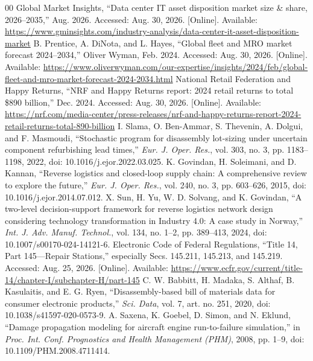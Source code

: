 \documentclass[a4paper,conference]{IEEEtran}
\begin{document}
\begin{thebibliography}{00}
 Global Market Insights, ``Data center IT asset disposition market size \& share, 2026--2035,'' Aug. 2026. Accessed: Aug. 30, 2026. [Online]. Available: \url{https://www.gminsights.com/industry-analysis/data-center-it-asset-disposition-market}
 B. Prentice, A. DiNota, and L. Hayes, ``Global fleet and MRO market forecast 2024--2034,'' Oliver Wyman, Feb. 2024. Accessed: Aug. 30, 2026. [Online]. Available: \url{https://www.oliverwyman.com/our-expertise/insights/2024/feb/global-fleet-and-mro-market-forecast-2024-2034.html}
 National Retail Federation and Happy Returns, ``NRF and Happy Returns report: 2024 retail returns to total \$890 billion,'' Dec. 2024. Accessed: Aug. 30, 2026. [Online]. Available: \url{https://nrf.com/media-center/press-releases/nrf-and-happy-returns-report-2024-retail-returns-total-890-billion}
 I. Slama, O. Ben-Ammar, S. Thevenin, A. Dolgui, and F. Masmoudi, ``Stochastic program for disassembly lot-sizing under uncertain component refurbishing lead times,'' \emph{Eur. J. Oper. Res.}, vol. 303, no. 3, pp. 1183--1198, 2022, doi: 10.1016/j.ejor.2022.03.025.
 K. Govindan, H. Soleimani, and D. Kannan, ``Reverse logistics and closed-loop supply chain: A comprehensive review to explore the future,'' \emph{Eur. J. Oper. Res.}, vol. 240, no. 3, pp. 603--626, 2015, doi: 10.1016/j.ejor.2014.07.012.
 X. Sun, H. Yu, W. D. Solvang, and K. Govindan, ``A two-level decision-support framework for reverse logistics network design considering technology transformation in Industry 4.0: A case study in Norway,'' \emph{Int. J. Adv. Manuf. Technol.}, vol. 134, no. 1--2, pp. 389--413, 2024, doi: 10.1007/s00170-024-14121-6.
 Electronic Code of Federal Regulations, ``Title 14, Part 145---Repair Stations,'' especially Secs. 145.211, 145.213, and 145.219. Accessed: Aug. 25, 2026. [Online]. Available: \url{https://www.ecfr.gov/current/title-14/chapter-I/subchapter-H/part-145}
 C. W. Babbitt, H. Madaka, S. Althaf, B. Kasulaitis, and E. G. Ryen, ``Disassembly-based bill of materials data for consumer electronic products,'' \emph{Sci. Data}, vol. 7, art. no. 251, 2020, doi: \mbox{10.1038/s41597-020-0573-9}.
 A. Saxena, K. Goebel, D. Simon, and N. Eklund, ``Damage propagation modeling for aircraft engine run-to-failure simulation,'' in \emph{Proc. Int. Conf. Prognostics and Health Management (PHM)}, 2008, pp. 1--9, doi: 10.1109/PHM.2008.4711414.

\end{thebibliography}
\end{document}
